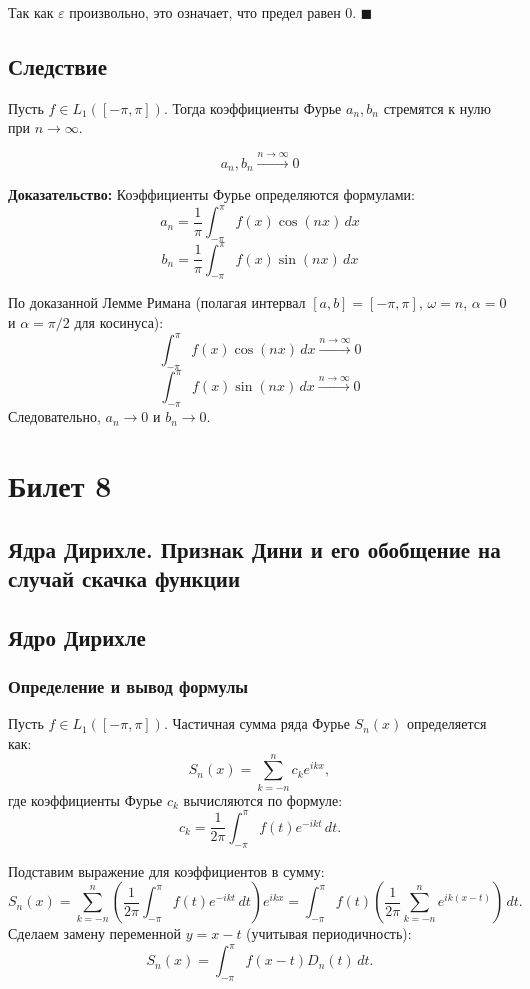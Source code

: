 \documentclass[12pt,a4paper,openany]{book}
\begin{document}
Так как $\varepsilon$ произвольно, это означает, что предел равен 0. $\blacksquare$

\vspace{1cm}

\section{Следствие}

Пусть $f \in L_1([-\pi, \pi])$. Тогда коэффициенты Фурье $a_n, b_n$ стремятся к нулю при $n \to \infty$.

$$ a_n, b_n \xrightarrow{n \to \infty} 0 $$

\textbf{Доказательство:}
Коэффициенты Фурье определяются формулами:
$$ a_n = \frac{1}{\pi} \int_{-\pi}^{\pi} f(x) \cos(nx) \, dx $$
$$ b_n = \frac{1}{\pi} \int_{-\pi}^{\pi} f(x) \sin(nx) \, dx $$

По доказанной Лемме Римана (полагая интервал $[a, b] = [-\pi, \pi]$, $\omega = n$, $\alpha = 0$ и $\alpha = \pi/2$ для косинуса):
$$ \int_{-\pi}^{\pi} f(x) \cos(nx) \, dx \xrightarrow{n \to \infty} 0 $$
$$ \int_{-\pi}^{\pi} f(x) \sin(nx) \, dx \xrightarrow{n \to \infty} 0 $$
Следовательно, $a_n \to 0$ и $b_n \to 0$.


\chapter{Билет 8 }
\section{Ядра Дирихле. Признак Дини и его обобщение на случай скачка функции}
\section{Ядро Дирихле}

\subsection{Определение и вывод формулы}
Пусть $f \in L_1([-\pi, \pi])$. Частичная сумма ряда Фурье $S_n(x)$ определяется как:
$$ S_n(x) = \sum_{k=-n}^{n} c_k e^{ikx}, $$
где коэффициенты Фурье $c_k$ вычисляются по формуле:
$$ c_k = \frac{1}{2\pi} \int_{-\pi}^{\pi} f(t) e^{-ikt} \, dt. $$

Подставим выражение для коэффициентов в сумму:
$$ S_n(x) = \sum_{k=-n}^{n} \left( \frac{1}{2\pi} \int_{-\pi}^{\pi} f(t) e^{-ikt} \, dt \right) e^{ikx} = \int_{-\pi}^{\pi} f(t) \left( \frac{1}{2\pi} \sum_{k=-n}^{n} e^{ik(x-t)} \right) \, dt. $$
Сделаем замену переменной $y = x - t$ (учитывая периодичность):
$$ S_n(x) = \int_{-\pi}^{\pi} f(x-t) D_n(t) \, dt. $$
\end{document}
